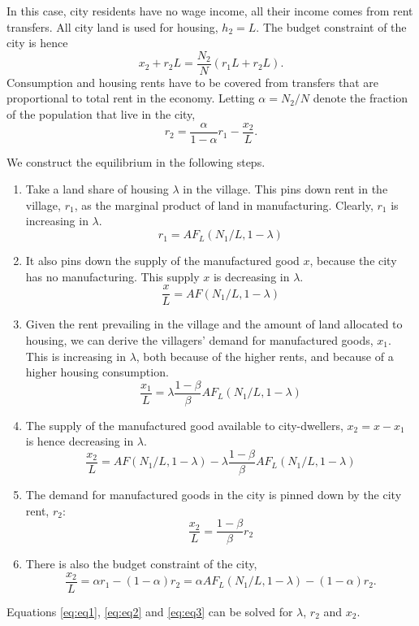 \documentclass[12pt]{article}
\begin{document}
In this case, city residents have no wage income, all their income comes from rent transfers. All city land is used for housing, $h_2=L$. The budget constraint of the city is hence
\[
x_2+r_2L = \frac{N_2}{N}(r_1L+r_2L).
\]
Consumption and housing rents have to be covered from transfers that are proportional to total rent in the economy. Letting $\alpha=N_2/N$ denote the fraction of the population that live in the city,
\[
r_2 = \frac{\alpha}{1-\alpha}r_1 -\frac{x_2}{L}.
\]

We construct the equilibrium in the following steps.
\begin{enumerate}
  \item Take a land share of housing ${\lambda}$ in the village. This pins down rent in the village, $r_1$, as the marginal product of land in manufacturing. Clearly, $r_1$ is increasing in ${\lambda}$.
      \[
      r_1 = AF_L(N_1/L,1-{\lambda})
      \]
  \item It also pins down the supply of the manufactured good $x$, because the city has no manufacturing. This supply $x$ is decreasing in ${\lambda}$.
      \[
      \frac{x}{L} = AF(N_1/L,1-{\lambda})
      \]
  \item Given the rent prevailing in the village and the amount of land allocated to housing, we can derive the villagers' demand for manufactured goods, $x_1$. This is increasing in ${\lambda}$, both because of the higher rents, and because of a higher housing consumption.
      \[
      \frac{x_1}{L} = {\lambda}\frac{1-\beta}{\beta}AF_L(N_1/L,1-{\lambda})
      \]
  \item The supply of the manufactured good available to city-dwellers, $x_2=x-x_1$ is hence decreasing in ${\lambda}$.
      \begin{equation}\label{eq:eq1}
      \frac{x_2}{L} = AF(N_1/L,1-{\lambda})-{\lambda}\frac{1-\beta}{\beta}AF_L(N_1/L,1-{\lambda})
      \end{equation}
  \item The demand for manufactured goods in the city is pinned down by the city rent, $r_2$:
      \begin{equation}\label{eq:eq2}
      \frac{x_2}{L} = \frac{1-\beta}{\beta}r_2
      \end{equation}
  \item There is also the budget constraint of the city,
  \begin{equation}\label{eq:eq3}
    \frac{x_2}{L} = \alpha r_1 -(1-\alpha)r_2 = \alpha AF_L(N_1/L,1-{\lambda}) -(1-\alpha)r_2.
  \end{equation}
\end{enumerate}
Equations \eqref{eq:eq1}, \eqref{eq:eq2} and \eqref{eq:eq3} can be solved for ${\lambda}$, $r_2$ and $x_2$.
\end{document}
